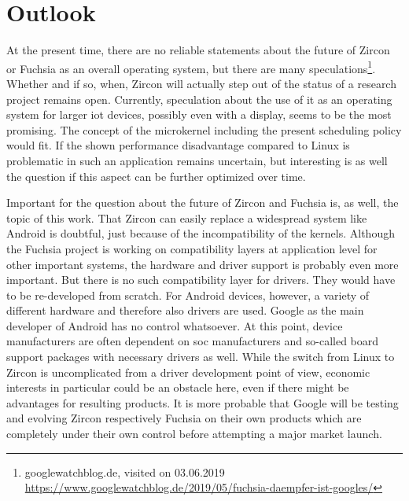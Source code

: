 
\chapter{Outlook}\label{ch:outlook}
%

At the present time, there are no reliable statements about the future of Zircon or Fuchsia as an overall operating system, but there are many speculations\footnote{googlewatchblog.de, visited on 03.06.2019 \url{https://www.googlewatchblog.de/2019/05/fuchsia-daempfer-ist-googles/}}.
Whether and if so, when, Zircon will actually step out of the status of a research project remains open.
Currently, speculation about the use of it as an operating system for larger \ac{iot} devices, possibly even with a display, seems to be the most promising.
The concept of the microkernel including the present scheduling policy would fit.
If the shown performance disadvantage compared to Linux is problematic in such an application remains uncertain, but interesting is as well the question if this aspect can be further optimized over time.

Important for the question about the future of Zircon and Fuchsia is, as well, the topic of this work.
That Zircon can easily replace a widespread system like Android is doubtful, just because of the incompatibility of the kernels.
Although the Fuchsia project is working on compatibility layers at application level for other important systems, the hardware and driver support is probably even more important.
But there is no such compatibility layer for drivers.
They would have to be re-developed from scratch.
For Android devices, however, a variety of different hardware and therefore also drivers are used.
Google as the main developer of Android has no control whatsoever.
At this point, device manufacturers are often dependent on \ac{soc} manufacturers and so-called board support packages with necessary drivers as well.
While the switch from Linux to Zircon is uncomplicated from a driver development point of view, economic interests in particular could be an obstacle here, even if there might be advantages for resulting products.
It is more probable that Google will be testing and evolving Zircon respectively Fuchsia on their own products which are completely under their own control before attempting a major market launch.

